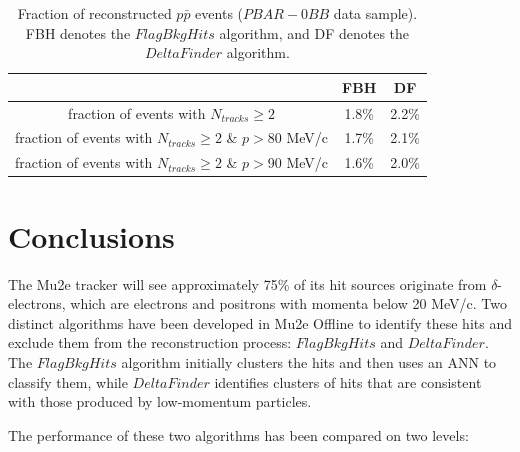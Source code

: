 \begin{center}
        \begin{table}[h!]
        \centering
        \renewcommand{\arraystretch}{1.}
        \begin{tabular}{| c | c | c |} 
            \hline
            &  FBH & DF\\
            \hline
            fraction of events with $N_{tracks} \geq 2$ &  1.8\% & 2.2\%\\
            \hline
            fraction of events with $N_{tracks} \geq 2$ \& $p>$80 MeV/c & 1.7\% & 2.1\%\\
            \hline
            fraction of events with $N_{tracks} \geq 2$ \& $p>$90 MeV/c & 1.6\% & 2.0\%\\
            \hline
            \end{tabular}
        \caption{Fraction of reconstructed $p\bar{p}$ events 
        ($PBAR-0BB$ data sample). FBH denotes the $FlagBkgHits$ algorithm, 
        and DF denotes the $DeltaFinder$ algorithm.}
        \label{tab:recoeffpbar}
        \end{table}
\end{center}

\section{Conclusions}
The Mu2e tracker will see approximately 75\% of its hit 
sources originate from $\delta$-electrons, which are electrons 
and positrons with momenta below 20 MeV/c. Two distinct algorithms 
have been developed in Mu2e Offline to identify these hits and exclude 
them from the reconstruction process: $FlagBkgHits$ and $DeltaFinder$. 
The $FlagBkgHits$ algorithm initially clusters the hits and then uses an ANN 
to classify them, while $DeltaFinder$ identifies clusters of hits that are 
consistent with those produced by low-momentum particles.

The performance of these two algorithms has been compared on two levels:

